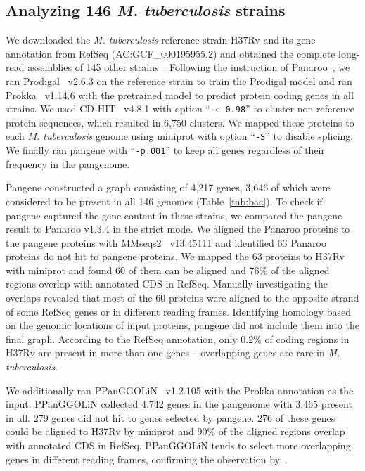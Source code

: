 \documentclass[webpdf,contemporary,large,namedate]{oup-authoring-template}%
\begin{document}
\subsection{Analyzing 146 \textit{M. tuberculosis} strains}

We downloaded the \emph{M. tuberculosis} reference strain H37Rv and its gene annotation from RefSeq (AC:GCF\_000195955.2)
and obtained the complete long-read assemblies of 145 other strains~\citep{Marin:2022aa}.
Following the instruction of Panaroo~\citep{Tonkin-Hill:2020aa},
we ran Prodigal~\citep{Hyatt:2010aa} v2.6.3 on the reference strain to train the Prodigal model
and ran Prokka~\citep{Seemann:2014aa} v1.14.6 with the pretrained model to predict protein coding genes in all strains.
We used CD-HIT~\citep{Li:2006aa,Fu:2012aa} v4.8.1 with option ``{\tt -c 0.98}'' to cluster non-reference protein sequences,
which resulted in 6,750 clusters.
We mapped these proteins to each \emph{M. tuberculosis} genome using miniprot with option ``{\tt -S}'' to disable splicing.
We finally ran pangene with ``{\tt -p.001}''
to keep all genes regardless of their frequency in the pangenome.

Pangene constructed a graph consisting of 4,217 genes,
3,646 of which were considered to be present in all 146 genomes (Table~\ref{tab:bac}).
To check if pangene captured the gene content in these strains,
we compared the pangene result to Panaroo v1.3.4 in the strict mode.
We aligned the Panaroo proteins to the pangene proteins with MMseqs2~\citep{Steinegger:2017aa} v13.45111
and identified 63 Panaroo proteins do not hit to pangene proteins.
We mapped the 63 proteins to H37Rv with miniprot
and found 60 of them can be aligned
and 76\% of the aligned regions overlap with annotated CDS in RefSeq.
Manually investigating the overlaps revealed that most of the 60 proteins
were aligned to the opposite strand of some RefSeq genes or in different reading frames.
Identifying homology based on the genomic locations of input proteins,
pangene did not include them into the final graph.
According to the RefSeq annotation,
only 0.2\% of coding regions in H37Rv are present in more than one genes --
overlapping genes are rare in \emph{M. tuberculosis}.

We additionally ran PPanGGOLiN~\citep{Gautreau:2020aa} v1.2.105 with the Prokka annotation as the input.
PPanGGOLiN collected 4,742 genes in the pangenome with 3,465 present in all.
279 genes did not hit to genes selected by pangene.
276 of these genes could be aligned to H37Rv by miniprot
and 90\% of the aligned regions overlap with annotated CDS in RefSeq.
PPanGGOLiN tends to select more overlapping genes in different reading frames,
confirming the observation by~\citet{Tonkin-Hill:2020aa}.
\end{document}
